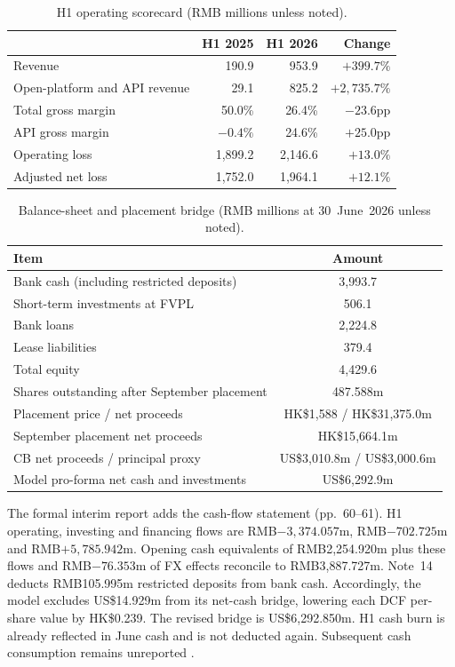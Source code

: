 \documentclass[11pt]{article}
\begin{document}
\begin{table}[H]
\centering
\caption{H1 operating scorecard (RMB millions unless noted).}
\begin{tabular}{lrrr}
\toprule
 & H1 2025 & H1 2026 & Change \\
\midrule
Revenue & 190.9 & 953.9 & $+399.7\%$ \\
Open-platform and API revenue & 29.1 & 825.2 & $+2{,}735.7\%$ \\
Total gross margin & 50.0\% & 26.4\% & $-23.6$pp \\
API gross margin & $-0.4\%$ & 24.6\% & $+25.0$pp \\
Operating loss & 1{,}899.2 & 2{,}146.6 & $+13.0\%$ \\
Adjusted net loss & 1{,}752.0 & 1{,}964.1 & $+12.1\%$ \\
\bottomrule
\end{tabular}
\end{table}

\begin{table}[H]
\centering
\caption{Balance-sheet and placement bridge (RMB millions at 30~June~2026 unless noted).}
\begin{tabular}{lc}
\toprule
Item & Amount \\
\midrule
Bank cash (including restricted deposits) & 3{,}993.7 \\
Short-term investments at FVPL & 506.1 \\
Bank loans & 2{,}224.8 \\
Lease liabilities & 379.4 \\
Total equity & 4{,}429.6 \\
\midrule
Shares outstanding after September placement & 487.588m \\
Placement price / net proceeds & HK\$1{,}588 / HK\$31{,}375.0m \\
September placement net proceeds & HK\$15{,}664.1m \\
CB net proceeds / principal proxy & US\$3{,}010.8m / US\$3{,}000.6m \\
Model pro-forma net cash and investments & US\$6{,}292.9m \\
\bottomrule
\end{tabular}
\end{table}

The formal interim report adds the cash-flow statement (pp.~60--61). H1 operating, investing and
financing flows are RMB$-3{,}374.057$m, RMB$-702.725$m and RMB$+5{,}785.942$m. Opening cash equivalents
of RMB2{,}254.920m plus these flows and RMB$-76.353$m of FX effects reconcile to RMB3{,}887.727m.
Note~14 deducts RMB105.995m restricted deposits from bank cash. Accordingly, the model excludes
US\$14.929m from its net-cash bridge, lowering each DCF per-share value by HK\$0.239. The revised
bridge is US\$6{,}292.850m. H1 cash burn is already reflected in June cash and is not deducted again.
Subsequent cash consumption remains unreported \citep{interimreport2026}.
\end{document}
